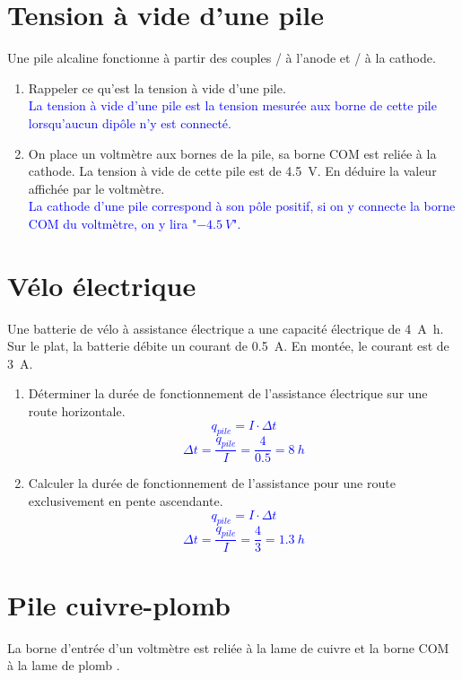 \documentclass[a4paper,11pt,fleqn]{article}%
\begin{document}
\section{Tension à vide d'une pile}
Une pile alcaline fonctionne à partir des couples / à l'anode et / à la cathode.

\begin{enumerate}
    \item Rappeler ce qu'est la tension à vide d'une pile.\\
    \textcolor{blue}{La tension à vide d'une pile est la tension mesurée aux borne de cette pile lorsqu'aucun dipôle n'y est connecté.}
    \item On place un voltmètre aux bornes de la pile, sa borne COM est reliée à la cathode. La tension à vide de cette pile est de \SI{4,5}{\volt}. En déduire la valeur affichée par le voltmètre.\\
    \textcolor{blue}{La cathode d'une pile correspond à son pôle positif, si on y connecte la borne COM du voltmètre, on y lira "$\SI{-4.5}{V}$".}
\end{enumerate}

\section{Vélo électrique}
Une batterie de vélo à assistance électrique a une capacité électrique de \SI{4}{\ampere \hour}. Sur le plat, la batterie débite un courant de \SI{0,5}{\ampere}. En montée, le courant est de \SI{3}{\ampere}.

\begin{enumerate}
    \item Déterminer la durée de fonctionnement de l'assistance électrique sur une route horizontale.\\
    \textcolor{blue}{$$q_{pile} = I \cdot \Delta t$$ $$ \Delta t = \dfrac{q_{pile}}{I} = \dfrac{\num{4}}{\num{0,5}} = \SI{8}{h}$$}
    \item Calculer la durée de fonctionnement de l'assistance pour une route exclusivement en pente ascendante.\\
    \textcolor{blue}{$$q_{pile} = I \cdot \Delta t$$ $$ \Delta t = \dfrac{q_{pile}}{I} = \dfrac{\num{4}}{\num{3}} = \SI{1,3}{h}$$}
\end{enumerate}

\section{Pile cuivre-plomb}
La borne d'entrée d'un voltmètre est reliée à la lame de cuivre  et la borne COM à la lame de plomb .
\end{document}

